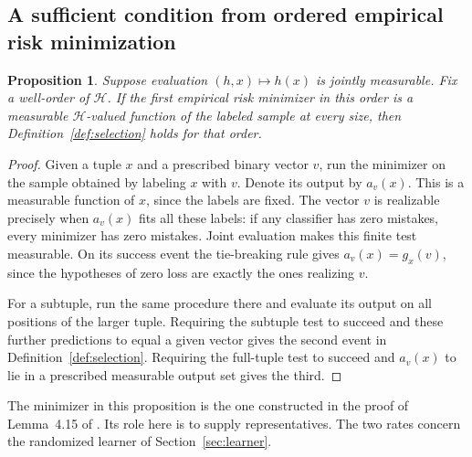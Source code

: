 \documentclass[11pt]{article}
\newtheorem{proposition}[theorem]{Proposition}
\theoremstyle{definition}\newtheorem{definition}[theorem]{Definition}
\newcommand{\HH}{\mathcal H}
\begin{document}
\subsection{A sufficient condition from ordered empirical risk minimization}

\begin{proposition}\label{prop:ordered-erm}
Suppose evaluation $(h,x)\mapsto h(x)$ is jointly measurable. Fix a well-order
of $\HH$. If the first empirical risk minimizer in this order is a measurable
$\HH$-valued function of the labeled sample at every size, then
Definition~\ref{def:selection} holds for that order.
\end{proposition}
\begin{proof}
Given a tuple $x$ and a prescribed binary vector $v$, run the minimizer on the
sample obtained by labeling $x$ with $v$. Denote its output by $a_v(x)$.
This is a measurable function of $x$, since the labels are fixed.
The vector $v$ is realizable precisely when $a_v(x)$ fits all these labels:
if any classifier has zero mistakes, every minimizer has zero mistakes.
Joint evaluation makes this finite test measurable. On its success event the
tie-breaking rule gives $a_v(x)=g_x(v)$, since the hypotheses of zero loss
are exactly the ones realizing $v$.

For a subtuple, run the same procedure there and evaluate its output on all
positions of the larger tuple. Requiring the subtuple test to succeed and
these further predictions to equal a given vector gives the second event
in Definition~\ref{def:selection}. Requiring the full-tuple test to succeed
and $a_v(x)$ to lie in a prescribed measurable output set gives the third.
\end{proof}

The minimizer in this proposition is the one constructed in the proof of
Lemma~4.15 of \cite{framework}. Its role here is to supply representatives.
The two rates concern the randomized learner of Section~\ref{sec:learner}.
\end{document}
